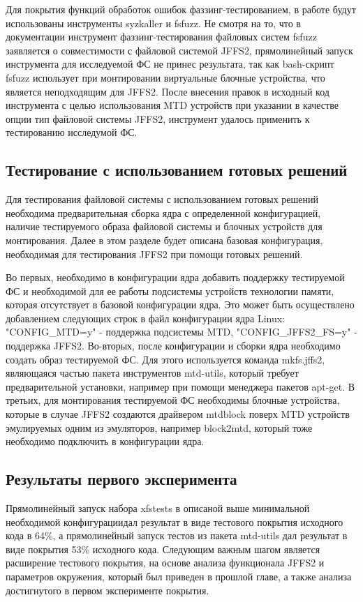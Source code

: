 Для покрытия функций обработок ошибок фаззинг-тестированием, в работе будут использованы инструменты syzkaller и fsfuzz. Не смотря на то, что в документации инструмент фаззинг-тестирования файловых систем fsfuzz заявляется о совместимости с файловой системой JFFS2, прямолинейный запуск инструмента для исследуемой ФС не принес результата, так как bash-скрипт fsfuzz использует при монтировании виртуальные блочные устройства, что является неподходящим для JFFS2. После внесения правок в исходный код инструмента с целью использования MTD устройств при указании в качестве опции тип файловой системы JFFS2, инструмент удалось применить к тестированию исследумой ФС. 

\subsection{Тестирование с использованием готовых решений}

Для тестирования файловой системы с использованием готовых решений необходима предварительная сборка ядра с определенной конфигурацией, наличие тестируемого образа файловой системы и блочных устройств для монтирования. Далее в этом разделе будет описана базовая конфигурация, необходимая для тестирования JFFS2 при помощи готовых решений.

Во первых, необходимо в конфигурации ядра добавить поддержку тестируемой ФС и необходимой для ее работы подсистемы устройств технологии памяти, которая отсутствует в базовой конфигурации ядра. Это может быть осуществлено добавлением следующих строк в файл конфигурации ядра Linux: "CONFIG\_MTD=y" - поддержка подсистемы MTD, "CONFIG\_JFFS2\_FS=y" - поддержка JFFS2. Во-вторых, после конфигурации и сборки ядра необходимо создать образ тестируемой ФС. Для этого используется команда mkfs.jffs2, являющаяся частью пакета инструментов mtd-utils, который требует предварительной установки, например при помощи менеджера пакетов apt-get. В третьих, для монтирования тестируемой ФС необходимы блочные устройства, которые в случае JFFS2 создаются драйвером mtdblock поверх MTD устройств эмулируемых одним из эмуляторов, например block2mtd, который тоже необходимо подключить в конфигурации ядра.

\subsection{Результаты первого эксперимента}

Прямолинейный запуск набора xfstests в описаной выше минимальной необходимой конфигурациидал результат в виде тестового покрытия исходного кода в 64\%, а прямолинейный запуск тестов из пакета mtd-utils дал результат в виде покрытия 53\% исходного кода. Следующим важным шагом является расширение тестового покрытия, на основе анализа функционала JFFS2 и параметров окружения, который был приведен в прошлой главе, а также анализа достигнутого в первом эксперименте покрытия.

